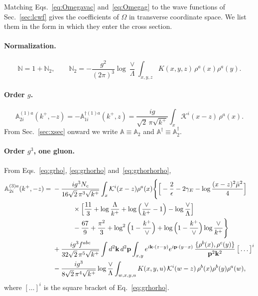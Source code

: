 \documentclass[aps,prd,onecolumn,superscriptaddress,nofootinbib,floatfix,longbibliography,11pt]{revtex4-2}
\numberwithin{equation}{section}
\newcommand{\KK}{\mathcal{K}}
\def\mf#1{\mathbb{#1}}
\begin{document}
Matching Eqs.~\eqref{eq:Omegavac} and~\eqref{eq:Omegag} to the wave functions of Sec.~\ref{sec:lcwf} gives the coefficients of $\Omega$ in transverse coordinate space. We list them in the form in which they enter the cross section.

\paragraph*{Normalization.}
\begin{equation}
\mf N=1+\mf N_2,\qquad \mf N_2=-\frac{g^2}{(2\pi)^3}\log\frac{\vee}{\Lambda}\int_{x,y,z}K(x,y,z)\,\rho^a(x)\rho^a(y).
\label{eq:Ncoef}
\end{equation}

\paragraph*{Order $g$.}
\begin{equation}
\mf A^{(1)a}_{2i}(k^+,-z)=-\mf A^{\dagger(1)a}_{1i}(k^+,z)=\frac{ig}{\sqrt2\,\pi\sqrt{k^+}}\int_x\KK^i(x-z)\,\rho^a(x).
\label{eq:A1X}
\end{equation}
From Sec.~\ref{sec:xsec} onward we write $\mf A\equiv\mf A_2$ and $\mf A^\dagger\equiv\mf A_2^\dagger$.

\paragraph*{Order $g^3$, one gluon.} From Eqs.~\eqref{eq:grho}, \eqref{eq:grhorho} and~\eqref{eq:grhorhorho},
\begin{align}
\mf A^{(3)a}_{2i}(k^+,-z)={}&-\frac{ig^3N_c}{16\sqrt2\,\pi^3\sqrt{k^+}}\int_x\KK^i(x-z)\rho^a(x)\Bigg\{\Big[-\frac2\epsilon-2\gamma_E-\log\frac{(x-z)^2\bar\mu^2}{4}\Big]\notag\\
&\hspace{3em}\times\Big[\frac{11}{3}+\log\frac{\Lambda}{k^+}+\log\Big(\frac{\vee}{k^+}-1\Big)-\log\frac{\vee}{\Lambda}\Big]\notag\\
&\hspace{3em}-\frac{67}{9}+\frac{\pi^2}{3}+\log^2\Big(1-\frac{k^+}{\vee}\Big)+\log\Big(1-\frac{k^+}{\vee}\Big)\log\frac{\vee}{k^+}\Bigg\}\notag\\
&+\frac{ig^3f^{abc}}{32\sqrt2\,\pi^5\sqrt{k^+}}\int d^2\mathbf k\,d^2\mathbf p\int_{x,y}e^{i\mathbf k\cdot(z-y)}e^{i\mathbf p\cdot(y-x)}\,\frac{\{\rho^b(x),\rho^c(y)\}}{\mathbf p^2\mathbf k^2}\,\big[\dots\big]^i\notag\\
&-\frac{ig^3}{8\sqrt2\,\pi^4\sqrt{k^+}}\log\frac{\vee}{\Lambda}\int_{w,x,y,u}K(x,y,u)\,\KK^i(w-z)\,\rho^b(x)\rho^b(y)\rho^a(w),
\label{eq:A3X}
\end{align}
where $[\dots]^i$ is the square bracket of Eq.~\eqref{eq:grhorho}.
\end{document}
